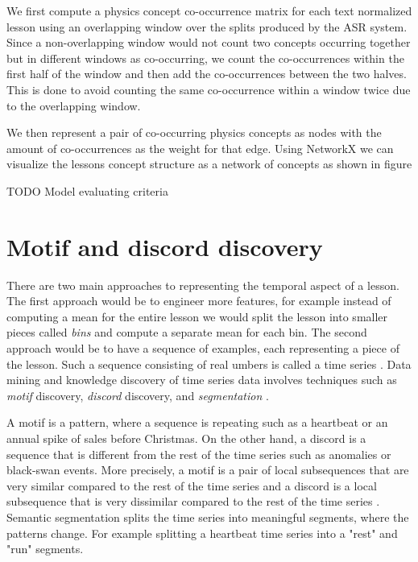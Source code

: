 \documentclass[utf8,english]{gradu3}
\begin{document}
We first compute a physics concept co-occurrence matrix for each text normalized lesson using an overlapping window over the splits produced by the ASR system. Since a non-overlapping window would not count two concepts occurring together but in different windows as co-occurring, we count the co-occurrences within the first half of the window and then add the co-occurrences between the two halves. This is done to avoid counting the same co-occurrence within a window twice due to the overlapping window.

We then represent a pair of co-occurring physics concepts as nodes with the amount of co-occurrences as the weight for that edge. Using NetworkX \parencite{hagbergExploringNetworkStructure2008} we can visualize the lessons concept structure as a network of concepts as shown in figure %

TODO Model evaluating criteria

\section{Motif and discord discovery}
There are two main approaches to representing the temporal aspect of a lesson. The first approach would be to engineer more features, for example instead of computing a mean for the entire lesson we would split the lesson into smaller pieces called \emph{bins} and compute a separate mean for each bin. The second approach would be to have a sequence of examples, each representing a piece of the lesson. Such a sequence consisting of real umbers is called a time series \parencite{yehMatrixProfileVI2017}. Data mining and knowledge discovery of time series data involves techniques such as \emph{motif} discovery, \emph{discord} discovery, and \emph{segmentation} \parencite{yehUniversalTimeSeries2018}.

A motif is a pattern, where a sequence is repeating such as a heartbeat or an annual spike of sales before Christmas. On the other hand, a discord is a sequence that is different from the rest of the time series such as anomalies or black-swan events. More precisely, a motif is a pair of local subsequences that are very similar compared to the rest of the time series and a discord is a local subsequence that is very dissimilar compared to the rest of the time series \parencite{yehUniversalTimeSeries2018}. Semantic segmentation splits the time series into meaningful segments, where the patterns change. For example splitting a heartbeat time series into a "rest" and "run" segments.
\end{document}
